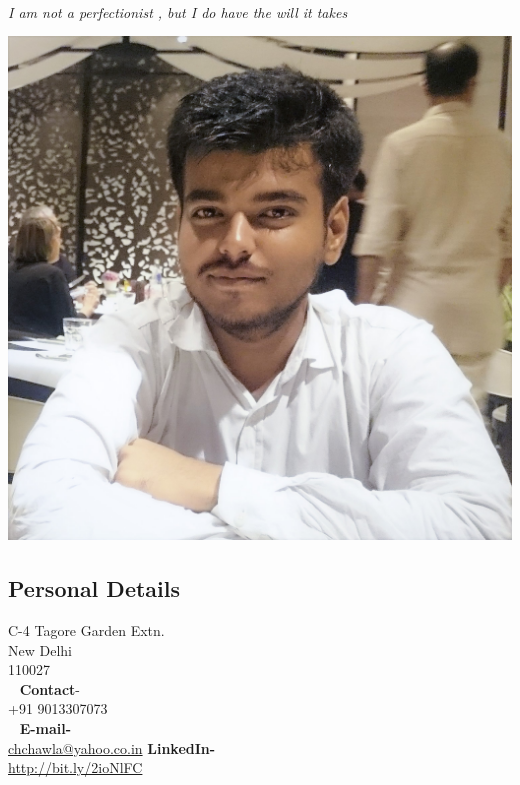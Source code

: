 \documentclass[11pt]{article}
\begin{document}
\begin{mdframed}[backgroundcolor=black]
~
\begin{center}
\begin{Huge}
\end{Huge}
\end{center}
\begin{center}
\begin{large}
\color{white}\emph{I am not a perfectionist , but I do have the will it takes}
\end{large}
\end{center}
\end{mdframed}
\begin{minipage}{0.25\linewidth}
\begin{center}
\includegraphics[scale=0.085]{picture}
\end{center}
\begin{flushright}
	\section{\color{green}Per\color{purple}s\color{black}onal D\color{purple}e\color{black}tai\color{purple}l\color{black}s}
    C-4  
    Tagore Garden Extn.\\
    New Delhi\\
    110027\\
    ~
    \textbf{Contact}-\\
    +91 9013307073\\
    ~
    \textbf{E-mail-}\\
    \href{mailto:chchawla@yahoo.co.in}{chchawla@yahoo.co.in}
    \textbf{LinkedIn-}\\
    \href{http://bit.ly/2ioNlFC}{http://bit.ly/2ioNlFC}
\end{flushright}

\end{minipage}
\end{document}
